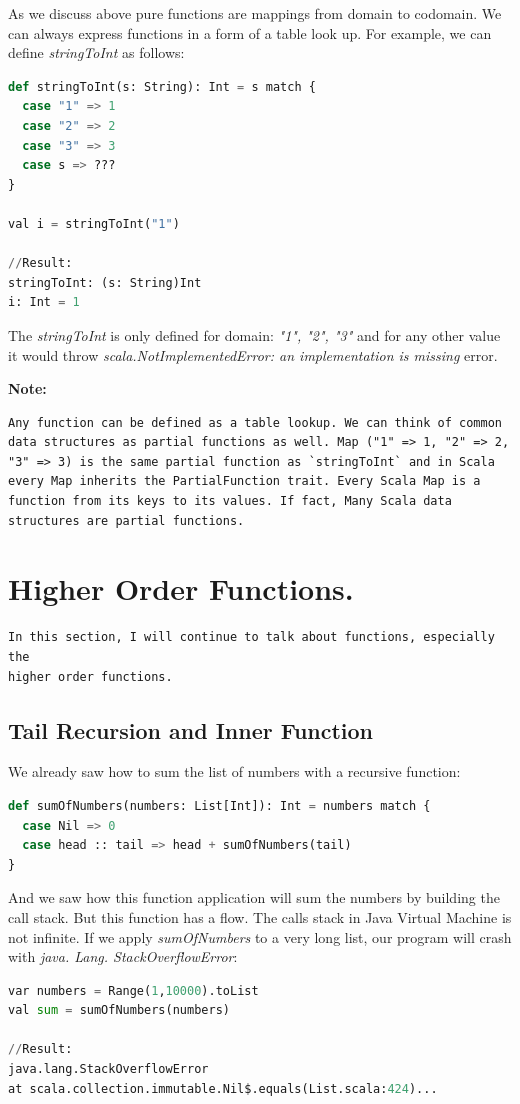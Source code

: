 \documentclass[12pt,twoside,a4paper]{report}
\begin{document}
As we discuss above  pure functions are mappings from domain to codomain. We can always express functions in a form of a table look up. For example, we can define \emph{stringToInt} as follows:
\begin{lstlisting}[language=python]
def stringToInt(s: String): Int = s match {
  case "1" => 1
  case "2" => 2
  case "3" => 3
  case s => ???
}
  
val i = stringToInt("1") 

//Result:
stringToInt: (s: String)Int
i: Int = 1
\end{lstlisting}

The \emph{stringToInt} is only defined for domain: \emph{{"1", "2", "3"}} and for any other value it would throw \emph{scala.NotImplementedError: an implementation is missing} error.

\textbf{Note:}
\begin{lstlisting}
Any function can be defined as a table lookup. We can think of common data structures as partial functions as well. Map ("1" => 1, "2" => 2, "3" => 3) is the same partial function as `stringToInt` and in Scala every Map inherits the PartialFunction trait. Every Scala Map is a function from its keys to its values. If fact, Many Scala data structures are partial functions.
\end{lstlisting}

\section{Higher Order Functions.}\label{6.5}
\begin{lstlisting}
In this section, I will continue to talk about functions, especially the
higher order functions.
\end{lstlisting}

\subsection{Tail Recursion and Inner Function}\label{6.5.1}

We already saw how to sum the list of numbers with a recursive function:
\begin{lstlisting}[language=python]
def sumOfNumbers(numbers: List[Int]): Int = numbers match {
  case Nil => 0
  case head :: tail => head + sumOfNumbers(tail)
}
\end{lstlisting}

And we saw how this function application will sum the numbers by building the call stack. But this function has a flow. The calls stack in Java Virtual Machine is not infinite. If we apply \emph{sumOfNumbers} to a very long list, our program will crash with \emph{java. Lang. StackOverflowError}:
\begin{lstlisting}[language=python]
var numbers = Range(1,10000).toList  
val sum = sumOfNumbers(numbers)
 
//Result:
java.lang.StackOverflowError
at scala.collection.immutable.Nil$.equals(List.scala:424)...
\end{lstlisting}
\end{document}
